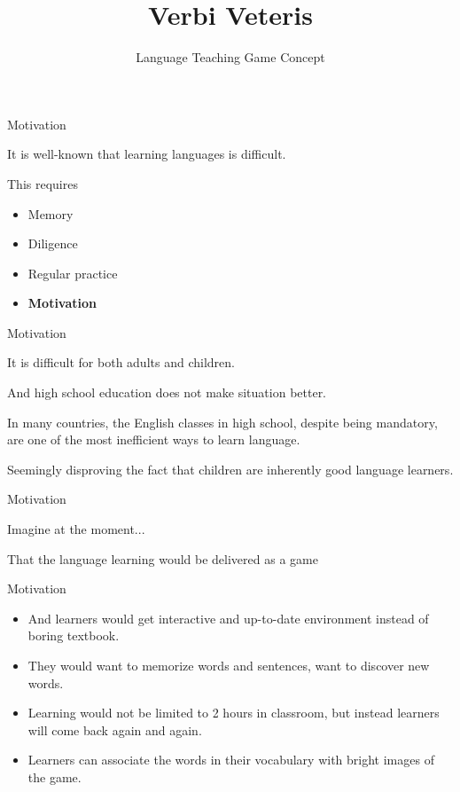\documentclass[pdf]{beamer}
\title{Verbi Veteris}
\subtitle{Language Teaching Game Concept}
\newcommand{\red}[1]{{\color[rgb]{0.6,0,0}#1}}
\begin{document}
\begin{frame}\titlepage\end{frame}
\begin{frame}{Motivation}
	\begin{block}{}It is well-known that learning languages is difficult. \end{block}
	\pause
	\begin{block}{}This requires\begin{itemize}
		\item Memory \item Diligence \item Regular practice \item \textbf{Motivation}\end{itemize}
	\end{block}
\end{frame}
\begin{frame}{Motivation}
	\begin{block}{}
		It is difficult for both adults and children.
	\end{block}
	\pause
	\begin{block}{}
		And high school education does not make situation better.
	\end{block}
	\pause
	\begin{block}{}
		In many countries, the English classes in high school, despite being mandatory, are one of the most
		\red{inefficient} ways to learn language.
	\end{block}
	\pause
	\begin{block}{}
		Seemingly disproving the fact that children are inherently good language learners.
	\end{block}
\end{frame}
\begin{frame}{Motivation}
	\begin{center}{\Huge Imagine at the moment...}\end{center}
	\pause
	\begin{center}{\huge That the language learning would be delivered as a \red{game}}\end{center}
\end{frame}
\begin{frame}{Motivation}
	\begin{itemize}
		\large
		\item<1-> And learners would get interactive and up-to-date environment instead of boring textbook.
		\item<2-> They would \red{want} to memorize words and sentences, want to discover new words.
		\item<3-> Learning would not be limited to 2 hours in classroom, but instead learners will come back again and again.
		\item<4-> Learners can associate the words in their vocabulary with bright images of the game.
	\end{itemize}
\end{frame}
\end{document}
